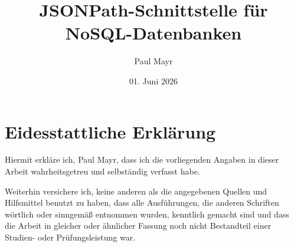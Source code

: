 \documentclass[oneside]{ausarbeitung}
\begin{document}
	
	\selectlanguage{ngerman}
	
	   \Masterarbeit
	
	
	\Informatik
	
	\title{JSONPath-Schnittstelle für NoSQL-Datenbanken}
	
	\author{Paul Mayr}
	
	\examinerIsAProfessortrue   %
	
	
	\date{01. Juni 2026}
	
	
	\maketitle
	\cleardoublepage
	
	\setcounter{page}{1}
	
	
	
	
	


\chapter*{Eidesstattliche Erklärung}
Hiermit erkläre ich, Paul Mayr, dass ich die vorliegenden Angaben in dieser Arbeit wahrheitsgetreu und selbständig verfasst habe.

Weiterhin versichere ich, keine anderen als die angegebenen Quellen und Hilfsmittel benutzt zu haben, dass alle Ausführungen, die anderen Schriften wörtlich oder sinngemäß entnommen wurden, kenntlich gemacht sind und dass die Arbeit in gleicher oder ähnlicher Fassung noch nicht Bestandteil einer Studien- oder Prüfungsleistung war.
\end{document}
